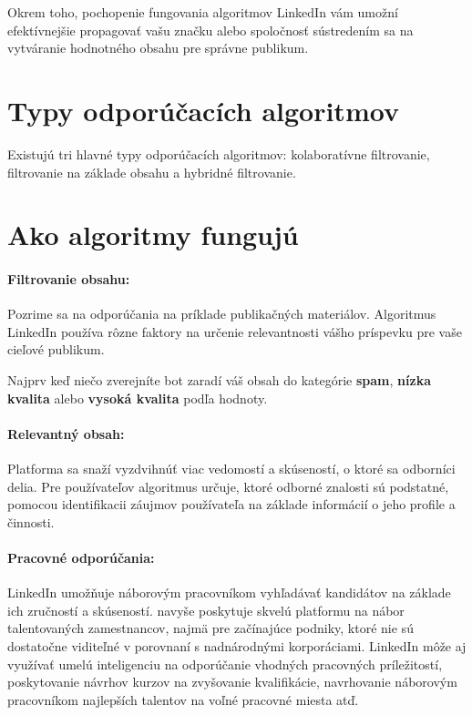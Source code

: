 \documentclass[twoside,slovak,a4paper]{coursepaper}
\begin{document}
Okrem toho, pochopenie fungovania algoritmov LinkedIn vám umožní efektívnejšie propagovať vašu značku alebo spoločnosť sústredením sa na vytváranie hodnotného obsahu pre správne publikum.


\section{Typy odporúčacích algoritmov} \label{Typy}
Existujú tri hlavné typy odporúčacích algoritmov: kolaboratívne filtrovanie, filtrovanie na základe obsahu a hybridné filtrovanie. 

\section{Ako algoritmy fungujú} \label{fungovanie}
\paragraph{Filtrovanie obsahu:}
Pozrime sa na odporúčania na príklade publikačných materiálov. Algoritmus LinkedIn používa rôzne faktory na určenie relevantnosti vášho príspevku pre vaše cieľové publikum.

Najprv keď niečo zverejníte bot zaradí váš obsah do kategórie \textbf{spam}, \textbf{nízka kvalita} alebo \textbf{vysoká kvalita} podľa hodnoty. ~\cite{Terez:article}

\paragraph{Relevantný obsah:}Platforma sa snaží vyzdvihnúť viac vedomostí a skúseností, o ktoré sa odborníci delia. Pre používateľov algoritmus určuje, ktoré odborné znalosti sú podstatné, pomocou identifikacii záujmov používateľa na základe informácií o jeho profile a činnosti.

\paragraph{Pracovné odporúčania:}
LinkedIn umožňuje náborovým pracovníkom vyhľadávať kandidátov na základe ich zručností a skúseností. navyše poskytuje skvelú platformu na nábor talentovaných zamestnancov, najmä pre začínajúce podniky, ktoré nie sú dostatočne viditeľné v porovnaní s nadnárodnými korporáciami.
LinkedIn môže aj využívať umelú inteligenciu na odporúčanie vhodných pracovných príležitostí, poskytovanie návrhov kurzov na zvyšovanie kvalifikácie, navrhovanie náborovým pracovníkom najlepších talentov na voľné pracovné miesta atď.~\cite{Mangla:article}
	
\end{document}
